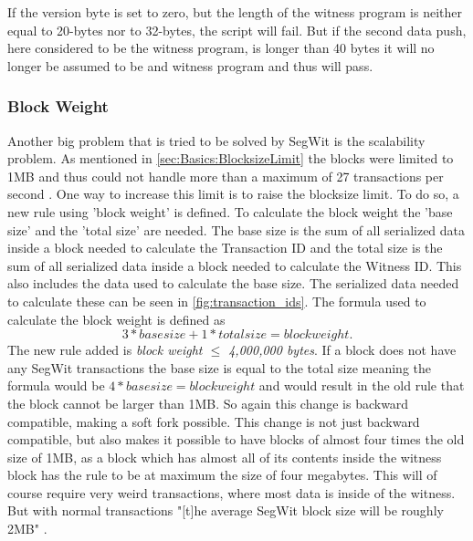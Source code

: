 If the version byte is set to zero, but the length of the witness program is neither equal to 20-bytes nor to 32-bytes, the script will fail. But if the second data push, here considered to be the witness program, is longer than 40 bytes it will no longer be assumed to be and witness program and thus will pass.

\subsubsection{Block Weight}
\label{subsec:SegWit:Implementation:BlockWeight}
Another big problem that is tried to be solved by SegWit is the scalability problem. As mentioned in \autoref{sec:Basics:BlocksizeLimit} the blocks were limited to 1MB and thus could not handle more than a maximum of 27 transactions per second \cite{transaction_limit}. One way to increase this limit is to raise the blocksize limit. To do so, a new rule using 'block weight' is defined. To calculate the block weight the 'base size' and the 'total size' are needed. The base size is the sum of all serialized data inside a block needed to calculate the Transaction ID and the total size is the sum of all serialized data inside a block needed to calculate the Witness ID. This also includes the data used to calculate the base size. The serialized data needed to calculate these can be seen in \autoref{fig:transaction_ids}. The formula used to calculate the block weight is defined as
\begin{equation*}
    3 * base size + 1 * total size = block weight.
\end{equation*}
The new rule added is \textit{block weight $\leq$ 4,000,000 bytes}.
If a block does not have any SegWit transactions the base size is equal to the total size meaning the formula would be $4 * base size = block weight$ and would result in the old rule that the block cannot be larger than 1MB. So again this change is backward compatible, making a soft fork possible. This change is not just backward compatible, but also makes it possible to have blocks of almost four times the old size of 1MB, as a block which has almost all of its contents inside the witness block has the rule to be at maximum the size of four megabytes. This will of course require very weird transactions, where most data is inside of the witness. But with normal transactions "[t]he average SegWit block size will be roughly 2MB" \cite{segwit_transaction_limit}.

